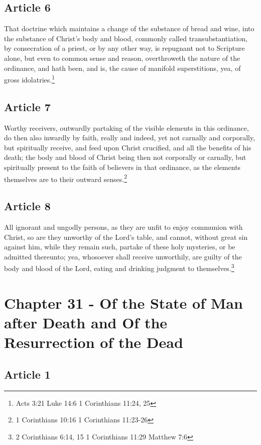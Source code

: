 \documentclass[12pt,letterpaper]{book}
\begin{document}
\section{Article 6}

That doctrine which maintains a change of the substance of bread and wine, into the substance of Christ's body and blood, commonly called transubstantiation, by consecration of a priest, or by any other way, is repugnant not to Scripture alone, but even to common sense and reason, overthroweth the nature of the ordinance, and hath been, and is, the cause of manifold superstitions, yea, of gross idolatries.\footnote{Acts 3:21 Luke 14:6 1 Corinthians 11:24, 25}

\section{Article 7}

Worthy receivers, outwardly partaking of the visible elements in this ordinance, do then also inwardly by faith, really and indeed, yet not carnally and corporally, but spiritually receive, and feed upon Christ crucified, and all the benefits of his death; the body and blood of Christ being then not corporally or carnally, but spiritually present to the faith of believers in that ordinance, as the elements themselves are to their outward senses.\footnote{1 Corinthians 10:16 1 Corinthians 11:23-26}

\section{Article 8}

All ignorant and ungodly persons, as they are unfit to enjoy communion with Christ, so are they unworthy of the Lord's table, and cannot, without great sin against him, while they remain such, partake of these holy mysteries, or be admitted thereunto; yea, whosoever shall receive unworthily, are guilty of the body and blood of the Lord, eating and drinking judgment to themselves.\footnote{2 Corinthians 6:14, 15 1 Corinthians 11:29 Matthew 7:6}

\chapter{Chapter 31 - Of the State of Man after Death and Of the Resurrection of the Dead}
\section{Article 1}
\end{document}
